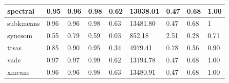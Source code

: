 \begin{table}[H]
\begin{tabular}{|l|l|l|l|l|l|l|l|l|}
\hline
spectral & 0.95 & 0.96 & 0.98 & 0.62 & 13038.01 & 0.47 & 0.68 & 1.00 \\
\hline
subkmeans & 0.96 & 0.96 & 0.98 & 0.63 & 13481.80 & 0.47 & 0.68 & 1 \\
\hline
syncsom & 0.55 & 0.79 & 0.59 & 0.03 & 852.18 & 2.51 & 0.28 & 0.71 \\
\hline
ttsas & 0.85 & 0.90 & 0.95 & 0.34 & 4979.41 & 0.78 & 0.56 & 0.90 \\
\hline
vade & 0.97 & 0.97 & 0.99 & 0.62 & 13194.78 & 0.47 & 0.68 & 1.00 \\
\hline
xmeans & 0.96 & 0.96 & 0.98 & 0.63 & 13480.91 & 0.47 & 0.68 & 1.00 \\
\hline
\end{tabular}
\end{table}



